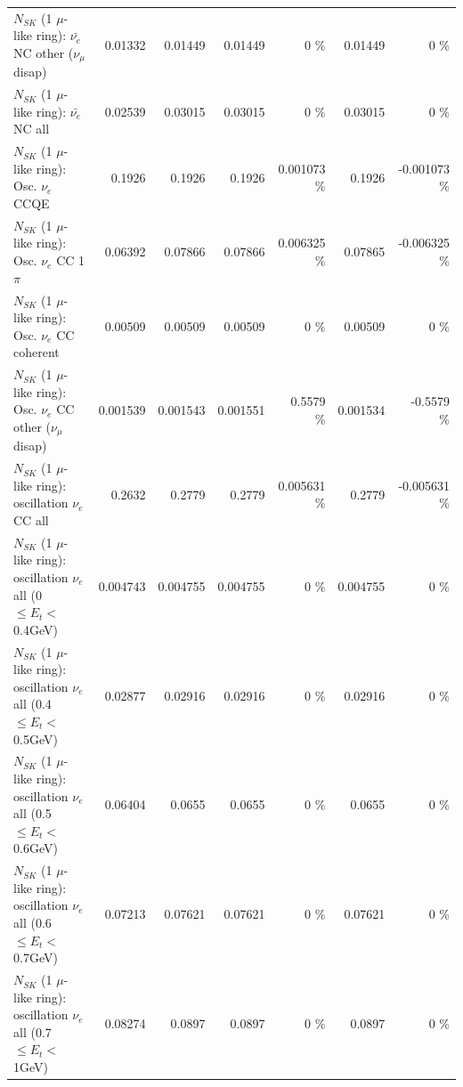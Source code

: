 \begin{table}
\begin{tabular}{| l | r | r | r  r | r  r |}
          $N_{SK}$ (1 $\mu$-like ring): $\bar{\nu_e}$ NC other ($\nu_\mu$ disap) &         0.01332 &         0.01449 &         0.01449 &        0 \%  &         0.01449 &        0 \%  \\ 
                            $N_{SK}$ (1 $\mu$-like ring): $\bar{\nu_{e}}$ NC all &         0.02539 &         0.03015 &         0.03015 &        0 \%  &         0.03015 &        0 \%  \\ 
\hline
\hline
\hline
                                 $N_{SK}$ (1 $\mu$-like ring): Osc. $\nu_e$ CCQE &          0.1926 &          0.1926 &          0.1926 & 0.001073 \%  &          0.1926 & -0.001073 \%  \\ 
                            $N_{SK}$ (1 $\mu$-like ring): Osc. $\nu_e$ CC 1$\pi$ &         0.06392 &         0.07866 &         0.07866 & 0.006325 \%  &         0.07865 & -0.006325 \%  \\ 
                          $N_{SK}$ (1 $\mu$-like ring): Osc. $\nu_e$ CC coherent &         0.00509 &         0.00509 &         0.00509 &        0 \%  &         0.00509 &        0 \%  \\ 
           $N_{SK}$ (1 $\mu$-like ring): Osc. $\nu_e$ CC other ($\nu_\mu$ disap) &        0.001539 &        0.001543 &        0.001551 &   0.5579 \%  &        0.001534 &  -0.5579 \%  \\ 
                        $N_{SK}$ (1 $\mu$-like ring): oscillation $\nu_e$ CC all &          0.2632 &          0.2779 &          0.2779 & 0.005631 \%  &          0.2779 & -0.005631 \%  \\ 
\hline
$N_{SK}$ (1 $\mu$-like ring): oscillation $\nu_{e}$ all (0 $\leq E_{t} <$ 0.4GeV) &        0.004743 &        0.004755 &        0.004755 &        0 \%  &        0.004755 &        0 \%  \\ 
$N_{SK}$ (1 $\mu$-like ring): oscillation $\nu_{e}$ all (0.4 $\leq E_{t} <$ 0.5GeV) &         0.02877 &         0.02916 &         0.02916 &        0 \%  &         0.02916 &        0 \%  \\ 
$N_{SK}$ (1 $\mu$-like ring): oscillation $\nu_{e}$ all (0.5 $\leq E_{t} <$ 0.6GeV) &         0.06404 &          0.0655 &          0.0655 &        0 \%  &          0.0655 &        0 \%  \\ 
$N_{SK}$ (1 $\mu$-like ring): oscillation $\nu_{e}$ all (0.6 $\leq E_{t} <$ 0.7GeV) &         0.07213 &         0.07621 &         0.07621 &        0 \%  &         0.07621 &        0 \%  \\ 
$N_{SK}$ (1 $\mu$-like ring): oscillation $\nu_{e}$ all (0.7 $\leq E_{t} <$ 1GeV) &         0.08274 &          0.0897 &          0.0897 &        0 \%  &          0.0897 &        0 \%  \\ 

\end{tabular}
\end{table}
